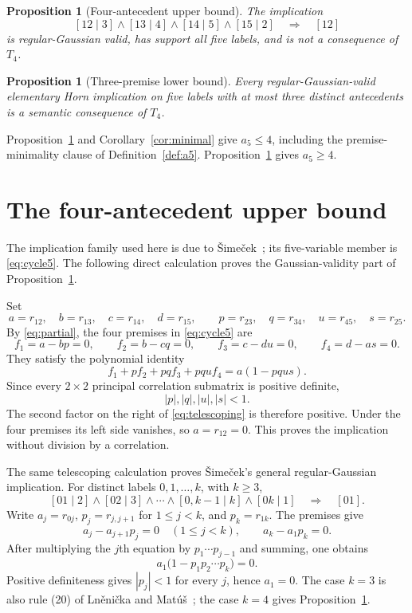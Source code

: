\documentclass[10pt]{article}
\newtheorem{proposition}[theorem]{Proposition}
\theoremstyle{definition}
\newcommand{\Tfour}{T_4}
\begin{document}
\begin{proposition}[Four-antecedent upper bound]\label{prop:upper}
The implication
\begin{equation}\label{eq:cycle5}
 [12\mid3]\wedge[13\mid4]\wedge[14\mid5]\wedge[15\mid2]
 \quad\Longrightarrow\quad[12]
\end{equation}
is regular-Gaussian valid, has support all five labels, and is not a consequence of $\Tfour$.
\end{proposition}

\begin{proposition}[Three-premise lower bound]\label{prop:lower}
Every regular-Gaussian-valid elementary Horn implication on five labels with at most three distinct antecedents is a semantic consequence of $\Tfour$.
\end{proposition}

Proposition~\ref{prop:upper} and Corollary~\ref{cor:minimal} give $a_5\le4$, including the premise-minimality clause of Definition~\ref{def:a5}.  Proposition~\ref{prop:lower} gives $a_5\ge4$.

\section{The four-antecedent upper bound}\label{sec:upper}

The implication family used here is due to \v{S}ime\v{c}ek~\cite{Simecek2006}; its five-variable member is \eqref{eq:cycle5}.  The following direct calculation proves the Gaussian-validity part of Proposition~\ref{prop:upper}.

Set
\[
 a=r_{12},\quad b=r_{13},\quad c=r_{14},\quad d=r_{15},
 \qquad p=r_{23},\quad q=r_{34},\quad u=r_{45},\quad s=r_{25}.
\]
By \eqref{eq:partial}, the four premises in \eqref{eq:cycle5} are
\[
 f_1=a-bp=0,\qquad f_2=b-cq=0,\qquad
 f_3=c-du=0,\qquad f_4=d-as=0.
\]
They satisfy the polynomial identity
\begin{equation}\label{eq:telescoping}
 f_1+p f_2+pq f_3+pqu f_4=a(1-pqus).
\end{equation}
Since every $2\times2$ principal correlation submatrix is positive definite,
\[
 |p|,|q|,|u|,|s|<1.
\]
The second factor on the right of \eqref{eq:telescoping} is therefore positive.  Under the four premises its left side vanishes, so $a=r_{12}=0$.  This proves the implication without division by a correlation.

The same telescoping calculation proves \v{S}ime\v{c}ek's general regular-Gaussian implication.  For distinct labels $0,1,\ldots,k$, with $k\ge3$,
\begin{equation}\label{eq:family}
 [01\mid2]\wedge[02\mid3]\wedge\cdots\wedge[0,k-1\mid k]
 \wedge[0k\mid1]\quad\Longrightarrow\quad[01].
\end{equation}
Write $a_j=r_{0j}$, $p_j=r_{j,j+1}$ for $1\le j<k$, and $p_k=r_{1k}$.  The premises give
\[
 a_j-a_{j+1}p_j=0\quad(1\le j<k),\qquad a_k-a_1p_k=0.
\]
After multiplying the $j$th equation by $p_1\cdots p_{j-1}$ and summing, one obtains
\[
 a_1\bigl(1-p_1p_2\cdots p_k\bigr)=0.
\]
Positive definiteness gives $|p_j|<1$ for every $j$, hence $a_1=0$.  The case $k=3$ is also rule (20) of Ln\v{e}ni\v{c}ka and Mat\'u\v{s}~\cite{LM2007}; the case $k=4$ gives Proposition~\ref{prop:upper}.
\end{document}
